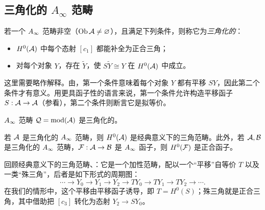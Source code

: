 \subsection{三角化的 \texorpdfstring{$A_\infty$}{A∞} 范畴}\label{sec:3h}
\begin{definition*}
若一个 $A_\infty$ 范畴非空（$\operatorname{Ob}\mathcal A\neq\varnothing$），且满足下列条件，则称它为\emph{三角化的}：
\begin{itemize}
\item $H^0(\mathcal A)$ 中每个态射 $[c_1]$ 都能补全为正合三角；
\item 对每个对象 $Y$，存在 $\widetilde Y$，使 $S\widetilde Y\cong Y$ 在 $H^0(\mathcal A)$ 中成立。
\end{itemize}

\end{definition*}
这里需要略作解释。由，第一个条件意味着每个对象 $Y$ 都有平移 $SY$，因此第二个条件才有意义。用更具函子性的语言来说，第一个条件允许构造平移函子 $S:\mathcal A\to\mathcal A$（参看），第二个条件则断言它是拟等价。
\begin{example}\label{st:3.13}
$A_\infty$ 范畴 $\mathcal Q=\operatorname{mod}(\mathcal A)$ 是三角化的。
\end{example}
\begin{proposition}\label{st:3.14}
若 $\mathcal A$ 是三角化的 $A_\infty$ 范畴，则 $H^0(\mathcal A)$ 是经典意义下的三角范畴。此外，若 $\mathcal A,\mathcal B$ 是三角化的 $A_\infty$ 范畴，$\mathcal F:\mathcal A\to\mathcal B$ 是 $A_\infty$ 函子，则 $H^0(\mathcal F)$ 是正合函子。
\end{proposition}
回顾经典意义下的三角范畴、：它是一个加性范畴，配以一个“平移”自等价 $T$ 以及一类“殊三角”，后者是如下形式的周期图：
\[
\cdots\longrightarrow Y_0\longrightarrow Y_1\longrightarrow Y_2\longrightarrow TY_0\longrightarrow TY_1\longrightarrow TY_2\longrightarrow\cdots.
\]
在我们的情形中，这个平移由平移函子诱导，即 $T=H^0(S)$；殊三角就是正合三角，其中借助把 $[c_3]$ 转化为态射 $Y_2\to SY_0$。

